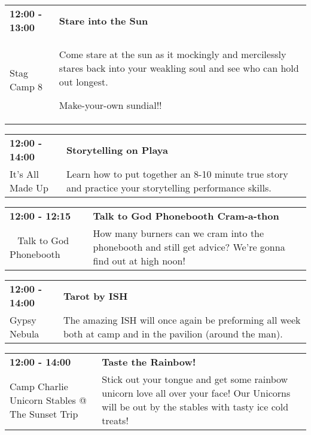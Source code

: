 \begin{tabular}{ p{1in} p{2.2in} }
    \textbf{12:00 - 13:00} & \textbf{Stare into the Sun} \\
    Stag Camp 8 \newline  & Come stare at the sun as it mockingly and mercilessly stares back into your weakling soul and see who can hold out longest.

Make-your-own sundial!! \\
    \hline 
\end{tabular}
    
\begin{tabular}{ p{1in} p{2.2in} }
    \textbf{12:00 - 14:00} & \textbf{Storytelling on Playa} \\
    It's All Made Up \newline  & Learn how to put together an 8-10 minute true story and practice your storytelling performance skills. \\
    \hline 
\end{tabular}
    
\begin{tabular}{ p{1in} p{2.2in} }
    \textbf{12:00 - 12:15} & \textbf{Talk to God Phonebooth Cram-a-thon} \\
    ~ \newline Talk to God Phonebooth & How many burners can we cram into the phonebooth and still get advice? We're gonna find out at high noon! \\
    \hline 
\end{tabular}
    
\begin{tabular}{ p{1in} p{2.2in} }
    \textbf{12:00 - 14:00} & \textbf{Tarot by ISH} \\
    Gypsy Nebula \newline  & The amazing ISH will once again be preforming all week both at camp and in the pavilion (around the man). \\
    \hline 
\end{tabular}
    
\begin{tabular}{ p{1in} p{2.2in} }
    \textbf{12:00 - 14:00} & \textbf{Taste the Rainbow!} \\
    Camp Charlie \newline Unicorn Stables @ The Sunset Trip & Stick out your tongue and get some rainbow unicorn love all over your face! Our Unicorns will be out by the stables with tasty ice cold treats! \\
    \hline 
\end{tabular}
    
